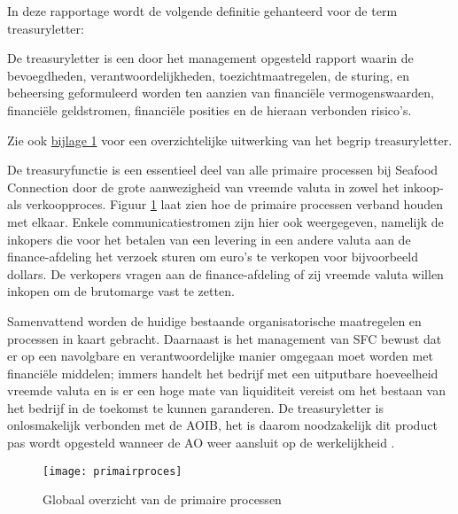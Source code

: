 \newpage
In deze rapportage wordt de volgende definitie gehanteerd voor de term \gls{treasuryletter}: 

\begin{displayquote}
De \gls{treasuryletter} is een door het management opgesteld rapport waarin de bevoegdheden, verantwoordelijkheden, toezichtmaatregelen, de sturing, en beheersing geformuleerd worden ten aanzien van financiële vermogenswaarden, financiële geldstromen, financiële posities en de hieraan verbonden risico’s. \\
\citep{jans,buunk} \label{def:treasury}
\end{displayquote}
\noindent
Zie ook \hyperlink{bij:treasury}{bijlage 1} voor een overzichtelijke uitwerking van het begrip \gls{treasuryletter}.

De treasuryfunctie is een essentieel deel van alle primaire processen bij Seafood Connection door de grote aanwezigheid van vreemde valuta in zowel het inkoop- als verkoopproces. Figuur \ref{fig:primairproces} laat zien hoe de primaire processen verband houden met elkaar. Enkele communicatiestromen zijn hier ook weergegeven, namelijk de inkopers die voor het betalen van een levering in een andere valuta aan de finance-afdeling het verzoek sturen om euro's te verkopen voor bijvoorbeeld dollars. De verkopers vragen aan de finance-afdeling of zij vreemde valuta willen inkopen om de brutomarge vast te zetten.

Samenvattend worden de huidige bestaande organisatorische maatregelen en processen in kaart gebracht. Daarnaast is het management van SFC bewust dat er op een navolgbare en verantwoordelijke manier omgegaan moet worden met financiële middelen; immers handelt het bedrijf met een uitputbare hoeveelheid vreemde valuta en is er een hoge mate van liquiditeit vereist om het bestaan van het bedrijf in de toekomst te kunnen garanderen. De \gls{treasuryletter} is onlosmakelijk verbonden met de AOIB, het is daarom noodzakelijk dit product pas wordt opgesteld wanneer de AO weer aansluit op de werkelijkheid \citep{watisonderzoek,buunk,financiering}.

\begin{figure}[!ht]
    \centering
    \texttt{[image: primairproces]}
    \caption{Globaal overzicht van de primaire processen \citep{bivpraktijk}}
    \label{fig:primairproces}
\end{figure}


